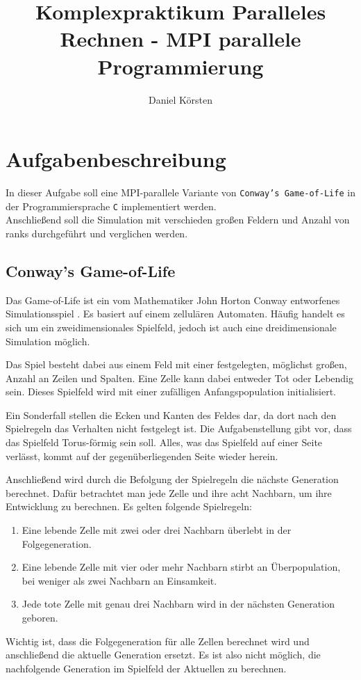 \documentclass[german,plainarticle,hyperref,utf8]{zihpub}
\author{Daniel Körsten}
\title{Komplexpraktikum Paralleles Rechnen - MPI parallele Programmierung}
\begin{document}
	\section{Aufgabenbeschreibung}
	In dieser Aufgabe soll eine MPI-parallele Variante von \texttt{Conway’s Game-of-Life} in der Programmiersprache \texttt{C} implementiert werden.\\
	Anschließend soll die Simulation mit verschieden großen Feldern und Anzahl von ranks durchgeführt und verglichen werden.
	
	\subsection{Conway’s Game-of-Life}
	Das Game-of-Life ist ein vom Mathematiker John Horton Conway entworfenes Simulationsspiel \cite{gardner}. Es basiert auf einem zellulären Automaten. Häufig handelt es sich um ein zweidimensionales Spielfeld, jedoch ist auch eine dreidimensionale Simulation möglich.
	
	Das Spiel besteht dabei aus einem Feld mit einer festgelegten, möglichst großen, Anzahl an Zeilen und Spalten. Eine Zelle kann dabei entweder Tot oder Lebendig sein. Dieses Spielfeld wird mit einer zufälligen Anfangspopulation initialisiert.
	
	Ein Sonderfall stellen die Ecken und Kanten des Feldes dar, da dort nach den Spielregeln das Verhalten nicht festgelegt ist. Die Aufgabenstellung gibt vor, dass das Spielfeld Torus-förmig sein soll. Alles, was das Spielfeld auf einer Seite verlässt, kommt auf der gegenüberliegenden Seite wieder herein.
	
	Anschließend wird durch die Befolgung der Spielregeln die nächste Generation berechnet. Dafür betrachtet man jede Zelle und ihre acht Nachbarn, um ihre Entwicklung zu berechnen. Es gelten folgende Spielregeln:
	\begin{enumerate}
		\item Eine lebende Zelle mit zwei oder drei Nachbarn überlebt in der Folgegeneration.
		\item Eine lebende Zelle mit vier oder mehr Nachbarn stirbt an Überpopulation, bei weniger als zwei Nachbarn an Einsamkeit.
		\item Jede tote Zelle mit genau drei Nachbarn wird in der nächsten Generation geboren.
	\end{enumerate}
	Wichtig ist, dass die Folgegeneration für alle Zellen berechnet wird und anschließend die aktuelle Generation ersetzt. Es ist also nicht möglich, die nachfolgende Generation im Spielfeld der Aktuellen zu berechnen.
	
\end{document}
